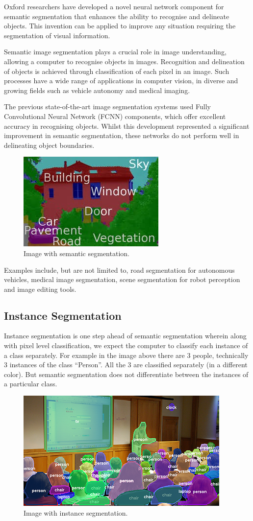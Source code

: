Oxford researchers have developed a novel neural network component for semantic segmentation that enhances the ability to recognise and delineate objects. This invention can be applied to improve any situation requiring the segmentation of visual information.

Semantic image segmentation plays a crucial role in image understanding, allowing a computer to recognise objects in images. Recognition and delineation of objects is achieved through classification of each pixel in an image. Such processes have a wide range of applications in computer vision, in diverse and growing fields such as vehicle autonomy and medical imaging.

The previous state-of-the-art image segmentation systems used Fully Convolutional Neural Network (FCNN) components, which offer excellent accuracy in recognising objects. Whilst this development represented a significant improvement in semantic segmentation, these networks do not perform well in delineating object boundaries.
\begin{figure}[H]
	\centering
	\includegraphics[width=0.5\linewidth]{images/semantic.jpg}
	\caption{Image with semantic segmentation.}
\end{figure}
Examples include, but are not limited to, road segmentation for autonomous vehicles, medical image segmentation, scene segmentation for robot perception and image editing tools.


\subsection{Instance Segmentation}\label{s:patt-insta}
Instance segmentation is one step ahead of semantic segmentation wherein along with pixel level classification, we expect the computer to classify each instance of a class separately. For example in the image above there are 3 people, technically 3 instances of the class “Person”. All the 3 are classified separately (in a different color). But semantic segmentation does not differentiate between the instances of a particular class.
\begin{figure}[H]
	\centering
	\includegraphics[width=0.5\linewidth]{images/instance.png}
	\caption{Image with instance segmentation.}
\end{figure}

